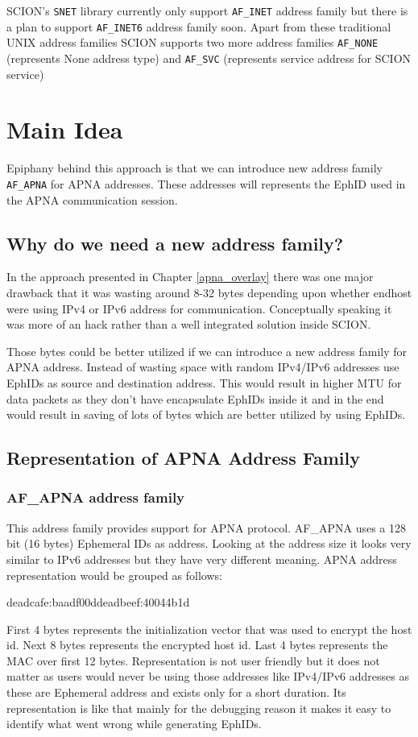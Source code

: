 SCION's \texttt{SNET} library currently only support \texttt{AF\_INET} address family but there is a plan to support \texttt{AF\_INET6} address family soon. Apart from these traditional UNIX address families SCION supports two more address families \texttt{AF\_NONE} (represents None address type) and \texttt{AF\_SVC} (represents service address for SCION service) 

\section{Main Idea} \label{addr:main_idea}
Epiphany behind this approach is that we can introduce new address family \texttt{AF\_APNA} for APNA addresses. These addresses will represents the EphID used in the APNA communication session.

\subsection{Why do we need a new address family?}
In the approach presented in Chapter \ref{apna_overlay} there was one major drawback that it was wasting around 8-32 bytes depending upon whether endhost were using IPv4 or IPv6 address for communication. Conceptually speaking it was more of an hack rather than a well integrated solution inside SCION. 

Those bytes could be better utilized if we can introduce a new address family for APNA address. Instead of wasting space with random IPv4/IPv6 addresses use EphIDs as source and destination address. This would result in higher MTU for data packets as they don't have encapsulate EphIDs inside it and in the end would result in saving of lots of bytes which are better utilized by using EphIDs.

\subsection{Representation of APNA Address Family}
\subsubsection{AF\_APNA address family}
This address family provides support for APNA protocol. AF\_APNA uses a 128 bit (16 bytes) Ephemeral IDs as address. Looking at the address size it looks very similar to IPv6 addresses but they have very different meaning. APNA address representation would be grouped as follows:
\begin{center}
deadcafe:baadf00ddeadbeef:40044b1d
\end{center}
First 4 bytes represents the initialization vector that was used to encrypt the host id. Next 8 bytes represents the encrypted host id. Last 4 bytes represents the MAC over first 12 bytes. Representation is not user friendly but it does not matter as users would never be using those addresses like IPv4/IPv6 addresses as these are Ephemeral address and exists only for a short duration. Its representation is like that mainly for the debugging reason it makes it easy to identify what went wrong while generating EphIDs.

